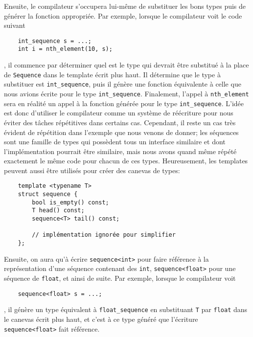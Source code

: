 Ensuite, le compilateur s'occupera lui-même de substituer les bons types puis
de générer la fonction appropriée. Par exemple, lorsque le compilateur voit le
code suivant
\begin{verbatim}
    int_sequence s = ...;
    int i = nth_element(10, s);
\end{verbatim}

, il commence par déterminer quel est le type qui devrait être substitué à
la place de {\tt Sequence} dans le template écrit plus haut. Il détermine
que le type à substituer est {\tt int\_sequence}, puis il génère une fonction
équivalente à celle que nous avions écrite pour le type {\tt int\_sequence}.
Finalement, l'appel à {\tt nth\_element} sera en réalité un appel à la
fonction générée pour le type {\tt int\_sequence}. L'idée est donc
d'utiliser le compilateur comme un système de réécriture pour nous
éviter des tâches répétitives dans certains cas. Cependant, il reste un cas
très évident de répétition dans l'exemple que nous venons de donner; les
séquences sont une famille de types qui possèdent tous un interface similaire
et dont l'implémentation pourrait être similaire, mais nous avons quand même
répété exactement le même code pour chacun de ces types. Heureusement, les
templates peuvent aussi être utilisés pour créer des canevas de types:
\begin{verbatim}
    template <typename T>
    struct sequence {
        bool is_empty() const;
        T head() const;
        sequence<T> tail() const;

        // implémentation ignorée pour simplifier
    };
\end{verbatim}

Ensuite, on aura qu'à écrire {\tt sequence<int>} pour faire référence à la
représentation d'une séquence contenant des {\tt int}, {\tt sequence<float>}
pour une séquence de {\tt float}, et ainsi de suite. Par exemple, lorsque le
compilateur voit
\begin{verbatim}
    sequence<float> s = ...;
\end{verbatim}

, il génère un type équivalent à {\tt float\_sequence} en substituant {\tt T}
par {\tt float} dans le canevas écrit plus haut, et c'est à ce type généré que
l'écriture {\tt sequence<float>} fait référence.






